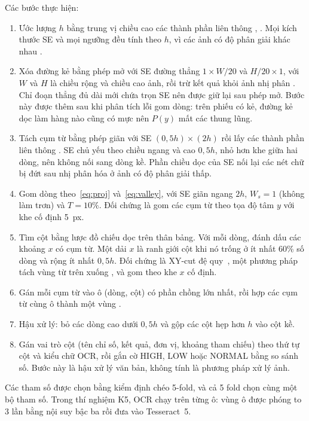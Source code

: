 Các bước thực hiện:
\begin{enumerate}
  \item Ước lượng $h$ bằng trung vị chiều cao các thành phần liên thông , .
        Mọi kích thước SE và mọi ngưỡng đều tính theo $h$, vì các ảnh có độ phân giải khác nhau .
  \item Xóa đường kẻ bằng phép mở với SE đường thẳng $1\times W/20$ và $H/20\times1$, với $W$ và $H$ là chiều rộng và chiều cao ảnh, rồi trừ kết quả khỏi ảnh nhị phân .
        Chỉ đoạn thẳng đủ dài mới chứa trọn SE nên được giữ lại sau phép mở.
        Bước này được thêm sau khi phân tích lỗi gom dòng: trên phiếu có kẻ, đường kẻ dọc làm hàng nào cũng có mực nên $P(y)$ mất các thung lũng.
  \item Tách cụm từ bằng phép giãn với SE $(0{,}5h)\times(2h)$ rồi lấy các thành phần liên thông .
        SE chủ yếu theo chiều ngang và cao $0{,}5h$, nhỏ hơn khe giữa hai dòng, nên không nối sang dòng kề.
        Phần chiều dọc của SE nối lại các nét chữ bị đứt sau nhị phân hóa ở ảnh có độ phân giải thấp.
  \item Gom dòng theo~\eqref{eq:proj} và~\eqref{eq:valley}, với SE giãn ngang $2h$, $W_s=1$ (không làm trơn) và $T=10\%$.
        Đối chứng là gom các cụm từ theo tọa độ tâm $y$ với khe cố định 5~px.
  \item Tìm cột bằng lược đồ chiếu dọc trên thân bảng.
        Với mỗi dòng, đánh dấu các khoảng $x$ có cụm từ.
        Một dải $x$ là ranh giới cột khi nó trống ở ít nhất 60\% số dòng và rộng ít nhất $0{,}5h$.
        Đối chứng là XY-cut đệ quy~\cite{nagy1984xycut}, một phương pháp tách vùng từ trên xuống , và gom theo khe $x$ cố định.
  \item Gán mỗi cụm từ vào ô (dòng, cột) có phần chồng lớn nhất, rồi hợp các cụm từ cùng ô thành một vùng .
  \item Hậu xử lý: bỏ các dòng cao dưới $0{,}5h$ và gộp các cột hẹp hơn $h$ vào cột kề.
  \item Gán vai trò cột (tên chỉ số, kết quả, đơn vị, khoảng tham chiếu) theo thứ tự cột và kiểu chữ OCR, rồi gắn cờ HIGH, LOW hoặc NORMAL bằng so sánh số.
        Bước này là hậu xử lý văn bản, không tính là phương pháp xử lý ảnh.
\end{enumerate}
Các tham số được chọn bằng kiểm định chéo 5-fold, và cả 5 fold chọn cùng một bộ tham số.
Trong thí nghiệm K5, OCR chạy trên từng ô: vùng ô được phóng to 3 lần bằng nội suy bậc ba rồi đưa vào Tesseract~5.
